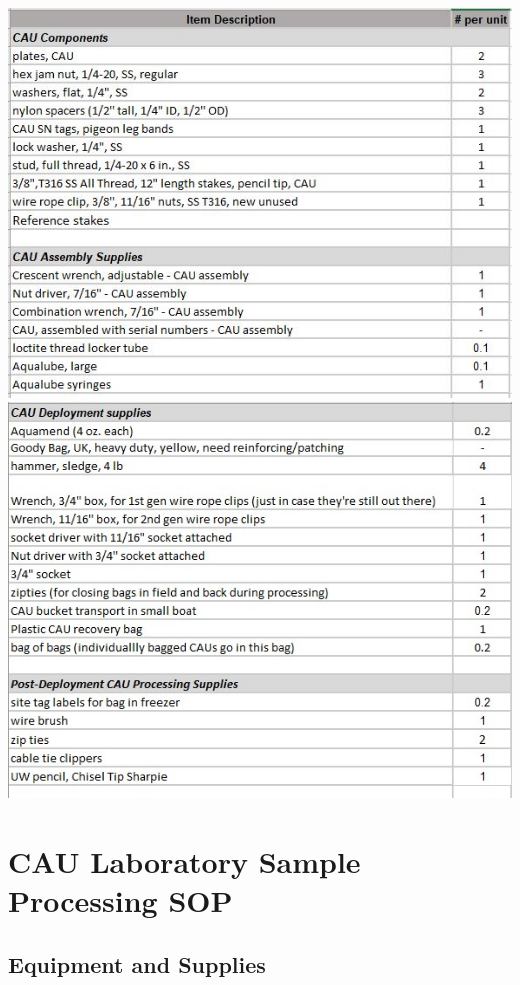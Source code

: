 \documentclass[]{book}
\begin{document}
\includegraphics{images/AssemblyEquipment1.jpg}
\includegraphics{images/AssemblyEquipment2.jpg}

\hypertarget{cau-laboratory-sample-processing-sop}{%
\section{CAU Laboratory Sample Processing SOP}\label{cau-laboratory-sample-processing-sop}}

\hypertarget{equipment-and-supplies-1}{%
\subsection{Equipment and Supplies}\label{equipment-and-supplies-1}}
\end{document}
